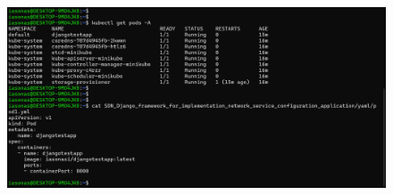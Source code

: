\begin{figure}[h]
	\centering
	\includegraphics[width=1.5\textwidth]{graphics/deploy_django.png}
	\caption{}
\end{figure}

